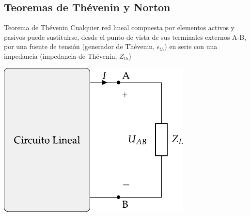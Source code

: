 \documentclass[aspectratio=169, usenames,svgnames,dvipsnames]{beamer}
\begin{document}

\subsection{Teoremas de Thévenin y Norton}

\begin{frame}{Teorema de Thévenin}
    \vspace{3mm}
    Cualquier \alert{red lineal} compuesta por elementos activos y pasivos puede sustituirse, desde el punto de vista de sus terminales externos A-B, por una \alert{fuente de tensión} (generador de Thévenin, \(\epsilon_{th}\)) en \alert{serie} con una impedancia (impedancia de Thévenin, \(Z_{th}\))

    \vspace{2mm}
    \begin{center}
        \includegraphics[height=0.6\textheight]{../figs/EquivalenteThevenin.pdf}
    \end{center}
\end{frame}

\end{document}
